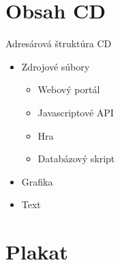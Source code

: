 \chapter{Obsah CD}
Adresárová štruktúra CD
\begin{itemize}
\item Zdrojové súbory
    \begin{itemize}
    \item Webový portál
    \item Javascriptové API
    \item Hra
    \item Databázový skript
    \end{itemize}
\item Grafika
\item Text
\end{itemize}
\chapter{Plakat}

